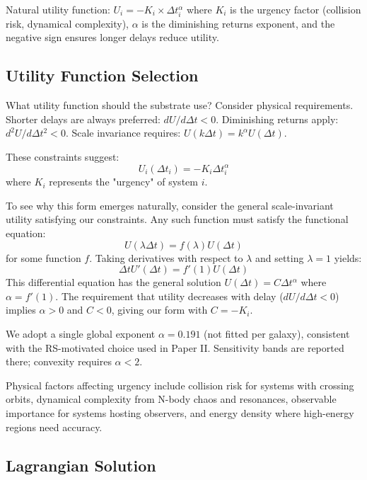 \documentclass[usenatbib]{mnras}
\begin{document}
Natural utility function: $U_i = -K_i \times \Delta t_i^\alpha$ where $K_i$ is the urgency factor (collision risk, dynamical complexity), $\alpha$ is the diminishing returns exponent, and the negative sign ensures longer delays reduce utility.

\subsection{Utility Function Selection}

What utility function should the substrate use? Consider physical requirements. Shorter delays are always preferred: $dU/d\Delta t < 0$. Diminishing returns apply: $d^2U/d\Delta t^2 < 0$. Scale invariance requires: $U(k\Delta t) = k^\alpha U(\Delta t)$.

These constraints suggest:
\begin{equation}
U_i(\Delta t_i) = -K_i \Delta t_i^\alpha
\end{equation}
where $K_i$ represents the "urgency" of system $i$.

To see why this form emerges naturally, consider the general scale-invariant utility satisfying our constraints. Any such function must satisfy the functional equation:
\begin{equation}
U(\lambda \Delta t) = f(\lambda) U(\Delta t)
\end{equation}
for some function $f$. Taking derivatives with respect to $\lambda$ and setting $\lambda = 1$ yields:
\begin{equation}
\Delta t U'(\Delta t) = f'(1) U(\Delta t)
\end{equation}
This differential equation has the general solution $U(\Delta t) = C \Delta t^{\alpha}$ where $\alpha = f'(1)$. The requirement that utility decreases with delay ($dU/d\Delta t < 0$) implies $\alpha > 0$ and $C < 0$, giving our form with $C = -K_i$.

We adopt a single global exponent $\alpha=0.191$ (not fitted per galaxy), consistent with the RS-motivated choice used in Paper II. Sensitivity bands are reported there; convexity requires $\alpha<2$.

Physical factors affecting urgency include collision risk for systems with crossing orbits, dynamical complexity from N-body chaos and resonances, observable importance for systems hosting observers, and energy density where high-energy regions need accuracy.

\subsection{Lagrangian Solution}
\end{document}
